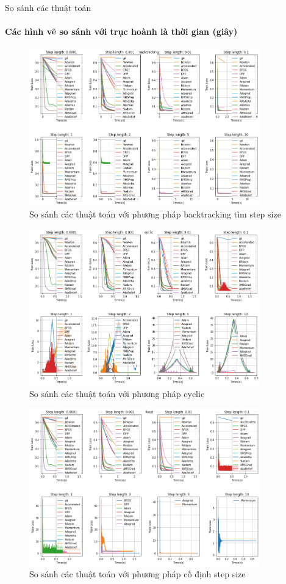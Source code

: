 \documentclass[10pt]{beamer}
\theoremstyle{remark}
\theoremstyle{definition}
\begin{document}
\begin{frame}[allowframebreaks]{So sánh các thuật toán}
	\framesubtitle{Các hình vẽ so sánh với trục hoành là thời gian (giây)}
	\begin{figure}
		\centering
		\includegraphics[width=10cm]{Thanh/backtrack-lr-step-op_time.png}
		\caption{So sánh các thuật toán với phương pháp backtracking tìm step size}
	\end{figure}

	\begin{figure}
		\centering
		\includegraphics[width=10cm]{Thanh/cyclic-lr-step-op_time.png}
		\caption{So sánh các thuật toán với phương pháp cyclic}
	\end{figure}

	\begin{figure}
		\centering
		\includegraphics[width=10cm]{Thanh/fixed-lr-step-op_time.png}
		\caption{So sánh các thuật toán với phương pháp cố định step size}
	\end{figure}


\end{frame}
\end{document}

